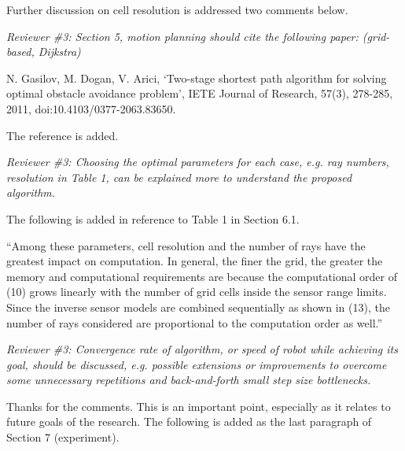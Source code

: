 \documentclass[11pt]{article}
\newenvironment{correction}{\begin{list}{}{\setlength{\leftmargin}{1cm}\setlength{\rightmargin}{1cm}}\vspace{\parsep}\item[]``}{''\end{list}}
\newcommand{\EditTL}[1]{{\color{red}\protect #1}}
\begin{document}
\begin{itemize}
Further discussion on cell resolution is addressed two comments below.

\item {\itshape Reviewer \#3: Section 5, motion planning should cite the following paper: (grid-based, Dijkstra)}

N. Gasilov, M. Dogan, V. Arici, `Two-stage shortest path algorithm for solving optimal obstacle avoidance problem', IETE Journal of Research, 57(3), 278-285, 2011, doi:10.4103/0377-2063.83650.

The reference is added.



\item {\itshape Reviewer \#3: Choosing the optimal parameters for each case, e.g. ray numbers, resolution in Table 1, can be explained more to understand the proposed algorithm.}

The following is added in reference to Table 1 in Section 6.1.

\begin{correction}Among these parameters, cell resolution and the number of rays have the greatest impact on computation. In general, the finer the grid, the greater the memory and computational requirements are because the computational order of (10) grows linearly with the number of grid cells inside the sensor range limits. Since the inverse sensor models are combined sequentially as shown in (13), the number of rays considered are proportional to the computation order as well.\end{correction}

\item {\itshape Reviewer \#3: Convergence rate of algorithm, or speed of robot while achieving its goal, should be discussed, e.g. possible extensions or improvements to overcome some unnecessary repetitions and back-and-forth small step size bottlenecks.}

Thanks for the comments. This is an important point, especially as it relates to future goals of the research. The following is added as the last paragraph of Section 7 (experiment).


\end{itemize}
\end{document}
